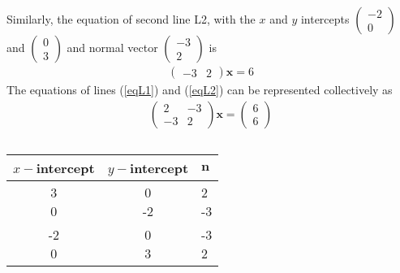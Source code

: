 \documentclass[12pt]{article}
\newcommand{\myvec}[1]{\ensuremath{\begin{pmatrix}#1\end{pmatrix}}} %
\begin{document}
\noindent Similarly, the equation of second line L2, with the $x$ and 
$y$ intercepts $\myvec{ -2 \\ 0}$ and $\myvec{ 0 \\ 3}$ and 
normal vector $\myvec{ -3 \\ 2}$ is
\begin{align}
	\myvec{-3 &  2 } {\mathbf{x}} = 6	\label{eqL2}
\end{align}
The equations of lines (\ref{eqL1}) and (\ref{eqL2}) can be represented 
collectively as
\begin{align}
	\myvec{2 & -3 \\ -3 & 2}\mathbf{x} = \myvec{6 \\ 6}
\end{align}
\begin{table}[htbp]
	\centering
	\begin{tabularx}{0.5\linewidth}{|c|c|X|} \hline 
	$x-$intercept & $y-$intercept & \quad $\mathbf{n}$  \\ \hline \hline
	\myvec{3\\0}	&	\myvec{0\\-2}	&	\myvec{2\\-3} \\ \hline
	\myvec{-2\\0}	&	\myvec{0\\3}	&	\myvec{-3\\2} \\ \hline
	\end{tabularx}
	\caption{}
\end{table}
\end{document}
